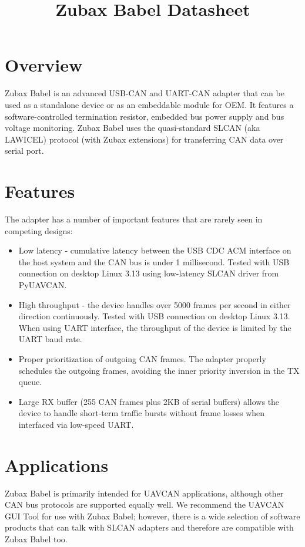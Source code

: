 \documentclass{zubaxdoc}
\title{Zubax Babel Datasheet}
\begin{document}
\frontmatter
\begin{titlepage}

\section*{Overview}

Zubax Babel is an advanced USB-CAN and UART-CAN adapter that can be used as a standalone device or as an embeddable module for OEM. It features a software-controlled termination resistor, embedded bus power supply and bus voltage monitoring. Zubax Babel uses the quasi-standard SLCAN (aka LAWICEL) protocol (with Zubax extensions) for transferring CAN data over serial port.

\section*{Features}

The adapter has a number of important features that are rarely seen in competing designs:
\begin{itemize}
\item Low latency - cumulative latency between the USB CDC ACM interface on the host system and the CAN bus is under 1 millisecond. Tested with USB connection on desktop Linux 3.13 using low-latency SLCAN driver from PyUAVCAN.
\item High throughput - the device handles over 5000 frames per second in either direction continuously. Tested with USB connection on desktop Linux 3.13. When using UART interface, the throughput of the device is limited by the UART baud rate.
\item Proper prioritization of outgoing CAN frames. The adapter properly schedules the outgoing frames, avoiding the inner priority inversion in the TX queue.
\item Large RX buffer (255 CAN frames plus 2KB of serial buffers) allows the device to handle short-term traffic bursts without frame losses when interfaced via low-speed UART.
\end{itemize}

\BeginRightColumn

\section*{Applications}

Zubax Babel is primarily intended for UAVCAN applications, although other CAN bus protocols are supported equally well. We recommend the UAVCAN GUI Tool for use with Zubax Babel; however, there is a wide selection of software products that can talk with SLCAN adapters and therefore are compatible with Zubax Babel too.


\end{titlepage}
\end{document}
